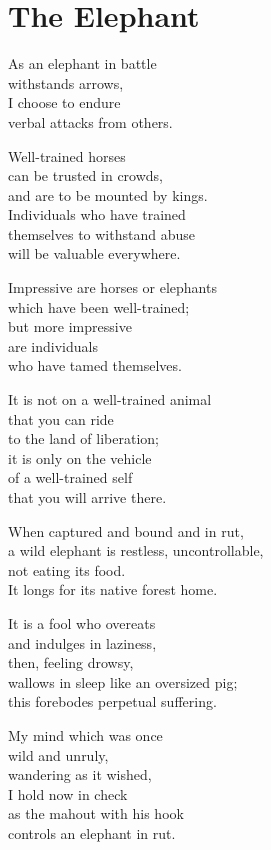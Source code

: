
\chapter{The Elephant}


As an elephant in battle\\
withstands arrows,\\
I choose to endure\\
verbal attacks from others.


Well-trained horses\\
can be trusted in crowds,\\
and are to be mounted by kings.\\
Individuals who have trained\\
themselves to withstand abuse\\
will be valuable everywhere.

Impressive are horses or elephants\\
which have been well-trained;\\
but more impressive\\
are individuals\\
who have tamed themselves.


It is not on a well-trained animal\\
that you can ride\\
to the land of liberation;\\
it is only on the vehicle\\
of a well-trained self\\
that you will arrive there.


When captured and bound and in rut,\\
a wild elephant is restless, uncontrollable,\\
not eating its food.\\
It longs for its native forest home.

It is a fool who overeats\\
and indulges in laziness,\\
then, feeling drowsy,\\
wallows in sleep like an oversized pig;\\
this forebodes perpetual suffering.


My mind which was once\\
wild and unruly,\\
wandering as it wished,\\
I hold now in check\\
as the mahout with his hook\\
controls an elephant in rut.


